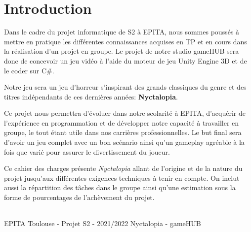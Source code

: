 \section{Introduction}
\setlength{\parindent}{5ex}
Dans le cadre du projet informatique de S2 à EPITA, nous sommes poussés à mettre en pratique les différentes connaissances acquises en TP et en cours dans la réalisation d'un projet en groupe.
Le projet de notre studio gameHUB sera donc de concevoir un jeu vidéo à l’aide du moteur de jeu Unity Engine 3D et de le coder sur C\#.

\setlength{\parindent}{5ex}
Notre jeu sera un jeu d’horreur s’inspirant des grands classiques du genre et des titres indépendants de ces dernières années: \textbf{Nyctalopia}.

\setlength{\parindent}{5ex}
Ce projet nous permettra d’évoluer dans notre scolarité à EPITA, d’acquérir de l'expérience en programmation et de développer notre capacité à travailler en groupe, le tout étant utile dans nos carrières professionnelles. Le but final sera d'avoir un jeu complet avec un bon scénario ainsi qu'un gameplay agréable à la fois que varié pour assurer le divertissement du joueur.

Ce cahier des charges présente \emph{Nyctalopia} allant de l'origine et de la nature du projet jusqu'aux différentes exigences techniques à tenir en compte. On inclut aussi la répartition des tâches dans le groupe ainsi qu'une estimation sous la forme de pourcentages de l'achèvement du projet.


\vfill
\noindent\makebox[\linewidth]{\rule{.8\paperwidth}{.6pt}}\\[0.2cm]
EPITA Toulouse - Projet S2 - 2021/2022 \hfill Nyctalopia - gameHUB
\noindent\makebox[\linewidth]{\rule{.8\paperwidth}{.6pt}}

\newpage